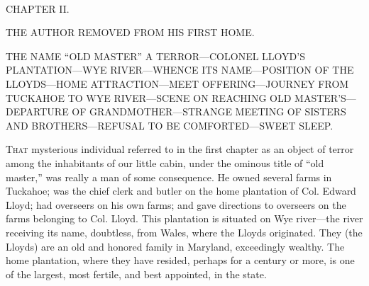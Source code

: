 {\protect\hypertarget{43}{}{}}

~

{CHAPTER II.}

THE AUTHOR REMOVED FROM HIS FIRST HOME.

{THE NAME ``OLD MASTER'' A TERROR---COLONEL LLOYD'S PLANTATION---WYE
RIVER---WHENCE ITS NAME---POSITION OF THE LLOYDS---HOME
ATTRACTION---MEET OFFERING---JOURNEY FROM TUCKAHOE TO WYE RIVER---SCENE
ON REACHING OLD MASTER'S---DEPARTURE OF GRANDMOTHER---STRANGE MEETING OF
SISTERS AND BROTHERS---REFUSAL TO BE COMFORTED---SWEET SLEEP.}

\textsc{That} mysterious individual referred to in the first chapter as
an object of terror among the inhabitants of our little cabin, under the
ominous title of ``old master,'' was really a man of some consequence.
He owned several farms in Tuckahoe; was the chief clerk and butler on
the home plantation of Col. Edward Lloyd; had overseers on his own
farms; and gave directions to overseers on the farms belonging to Col.
Lloyd. This plantation is situated on Wye river---the river receiving
its name, doubtless, from Wales, where the Lloyds originated. They (the
Lloyds) are an old and honored family in Maryland, exceedingly wealthy.
The home plantation, where they have resided, perhaps for a century or
more, is one of the largest, most fertile, and best appointed, in the
state.

